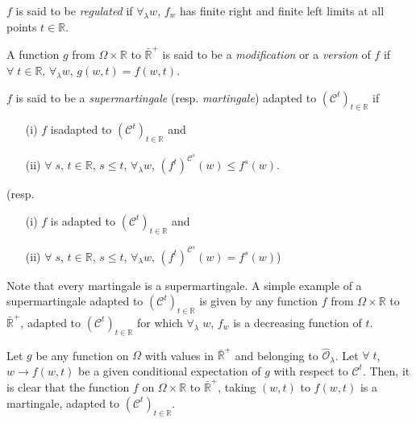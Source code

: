 \begin{defn}\label{part2:chap4:def59}
$f$ is said to be {\em regulated} if $\forall_\lambda w$, $f_w$ has
  finite right and finite left limits at all points $t \in
  \mathbb{R}$. 
\end{defn}

\begin{defn}\label{part2:chap4:def60}
A function $g$ from $\Omega \times \mathbb{R}$ to $\bar{\mathbb{R}}^+$
is said to be a {\em modification} or a {\em version} of $f$ if
$\forall \; t \in \mathbb{R}$, $\forall_\lambda w$, $g (w,t) =
f(w,t)$. 
\end{defn}

\begin{defn}\label{part2:chap4:def61}
$f$ is said to be a {\em supermartingale} (resp. {\em martingale})
  adapted to $(\mathscr{C}^t)_{t \in \mathbb{R}}$ if 
\begin{itemize}
\item[{\rm (i)}] $f$ is\pageoriginale adapted to $(\mathscr{C}^t)_{t \in
  \mathbb{R}}$  and 

\item[{\rm (ii)}] $\forall \; s$, $t \in \mathbb{R}$, $s \leq t$,
  $\forall_\lambda w$, $(f^t)^{\mathscr{C}^s} (w) \leq f^s(w)$. 
\end{itemize}
(resp.
\begin{itemize}
\item[{\rm (i)}] $f$ is adapted to $(\mathscr{C}^t)_{t \in
  \mathbb{R}}$ and 

\item[{\rm (ii)}] $\forall \; s$, $t \in \mathbb{R}$, $s \leq t$,
  $\forall_\lambda w$, $(f^t)^{\mathscr{C}^s} (w) = f^s(w)$)
\end{itemize}

Note that every martingale is a supermartingale. A simple example of a
supermartingale adapted to $(\mathscr{C}^t)_{t\in \mathbb{R}}$ is
given by any function $f$ from $\Omega \times \mathbb{R}$ to
$\bar{\mathbb{R}}^+$, adapted to $(\mathscr{C}^t)_{t \in \mathbb{R}}$
for which $\forall_\lambda \; w$, $f_w$ is a decreasing function of
$t$. 
\end{defn}


Let $g$ be any function on $\Omega$ with values in
$\bar{\mathbb{R}}^+$ and belonging to $\hat{\mathscr{O}}_\lambda$. Let
$\forall \; t$, $w \to f(w,t)$ be a given conditional expectation of
$g$ with respect to $\mathscr{C}^t$. Then, it is clear that the
function $f$ on $\Omega \times \mathbb{R}$ to $\bar{\mathbb{R}}^+$,
taking $(w,t)$ to $f(w,t)$ is a martingale, adapted to
$(\mathscr{C}^t)_{t \in \mathbb{R}}$. 

